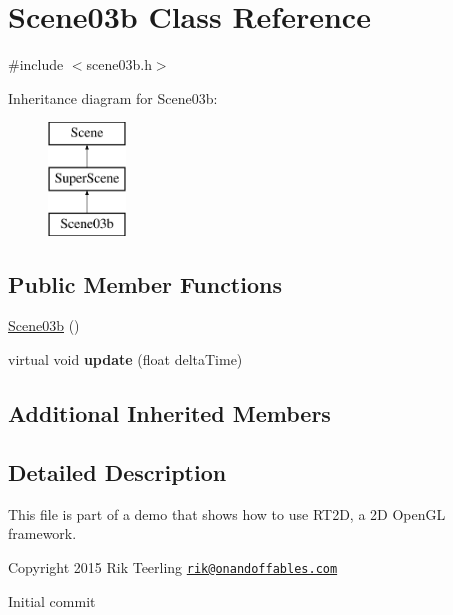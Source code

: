 \hypertarget{class_scene03b}{}\section{Scene03b Class Reference}
\label{class_scene03b}


{\ttfamily \#include $<$scene03b.\+h$>$}

Inheritance diagram for Scene03b\+:\begin{figure}[H]
\begin{center}
\leavevmode
\includegraphics[height=3.000000cm]{class_scene03b}
\end{center}
\end{figure}
\subsection*{Public Member Functions}
\begin{DoxyCompactItemize}
\item 
\hyperlink{class_scene03b_a24f82c7664305aeeaeb86ffd681d6a3f}{Scene03b} ()
\item 
\mbox{\label{class_scene03b_abdb8e9b90007a61b4b385a777dc51779}} 
virtual void {\bfseries update} (float delta\+Time)
\end{DoxyCompactItemize}
\subsection*{Additional Inherited Members}


\subsection{Detailed Description}
This file is part of a demo that shows how to use R\+T2D, a 2D Open\+GL framework.


\begin{DoxyItemize}
\item Copyright 2015 Rik Teerling \href{mailto:rik@onandoffables.com}{\tt rik@onandoffables.\+com}
\begin{DoxyItemize}
\item Initial commit 
\end{DoxyItemize}
\end{DoxyItemize}

